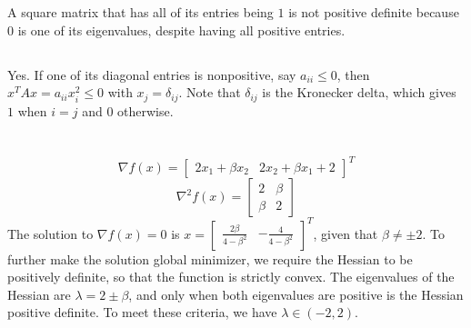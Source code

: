 \documentclass[11pt]{article}
\begin{document}
\section{}
\subsection{}
A square matrix that has all of its entries being $1$ is not positive definite because $0$ is one of its eigenvalues, despite having all positive entries.
\subsection{}
Yes. If one of its diagonal entries is nonpositive, say $a_{ii}\leq0$, then $x^TAx=a_{ii}x_i^2\leq0$ with $x_j=\delta_{ij}$. Note that $\delta_{ij}$ is the Kronecker delta, which gives $1$ when $i=j$ and $0$ otherwise.
\section{}

\section{}
$$\nabla f(x)=\begin{bmatrix}2x_1+\beta x_2 & 2x_2+\beta x_1+2\end{bmatrix}^T$$ $$\nabla^2f(x)=\begin{bmatrix}2 & \beta \\ \beta & 2 \end{bmatrix}$$
The solution to $\nabla f(x)=0$ is $x=\begin{bmatrix} \frac{2\beta}{4-\beta^2} & -\frac{4}{4-\beta^2} \end{bmatrix}^T$, given that $\beta\neq\pm2$. To further make the solution global minimizer, we require the Hessian to be positively definite, so that the function is strictly convex. The eigenvalues of the Hessian are $\lambda=2\pm\beta$, and only when both eigenvalues are positive is the Hessian positive definite. To meet these criteria, we have $\lambda\in(-2,2)$.
\section{}
\section{}
\end{document}
